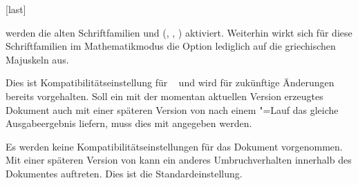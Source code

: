 \begin{Declaration*}{}
\begin{Declaration*}{}
\begin{Declaration*}{}
\begin{Declaration}[v2.03]{}[last]
\begin{values}{}
  werden die alten Schriftfamilien \Univers und \DIN 
  (, , )
  aktiviert. Weiterhin wirkt sich für diese Schriftfamilien im Mathematikmodus 
  die Option  lediglich auf die griechischen 
  Majuskeln aus.
\item[\PValue{2.06}]
  Dies ist Kompatibilitätseinstellung für \TUDScript~\vTUDScript{} und wird für 
  zukünftige Änderungen bereits vorgehalten. Soll ein mit der momentan 
  aktuellen Version erzeugtes Dokument auch mit einer späteren Version von 
  \TUDScript nach einem "=Lauf das gleiche Ausgabeergebnis 
  liefern, muss dies mit  angegeben werden.
\item[\PValue{last}]
  Es werden keine Kompatibilitätseinstellungen für das Dokument vorgenommen. 
  Mit einer späteren Version von \TUDScript kann ein anderes Umbruchverhalten 
  innerhalb des Dokumentes auftreten. Dies ist die Standardeinstellung.
\end{values}
\end{Declaration}
\end{Declaration*}
\end{Declaration*}
\end{Declaration*}

